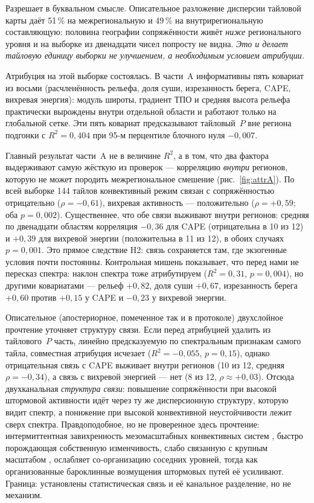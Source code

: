 \documentclass[11pt,a4paper]{article}
\begin{document}
Разрешает в буквальном смысле. Описательное разложение дисперсии тайловой карты даёт 51\,\% на межрегиональную и 49\,\% на внутрирегиональную составляющую: половина географии сопряжённости живёт \emph{ниже} регионального уровня и на выборке из двенадцати чисел попросту не видна. \emph{Это и делает тайловую единицу выборки не улучшением, а необходимым условием атрибуции.}

Атрибуция на этой выборке состоялась. В части~A информативны пять ковариат из восьми (расчленённость рельефа, доля суши, изрезанность берега, CAPE, вихревая энергия): модуль широты, градиент ТПО и средняя высота рельефа практически вырождены внутри отдельной области и работают только на глобальной сетке. Эти пять ковариат предсказывают тайловый~$P$ вне региона подгонки с $R^2=0{,}404$ при 95-м перцентиле блочного нуля $-0{,}007$.

Главный результат части~A не в величине $R^2$, а в том, что два фактора выдерживают самую жёсткую из проверок --- корреляцию \emph{внутри} регионов, которую не может породить межрегиональное смешение (рис.~\ref{fig:attrA}). По всей выборке 144 тайлов конвективный режим связан с сопряжённостью отрицательно ($\rho=-0{,}61$), вихревая активность --- положительно ($\rho=+0{,}59$; оба $p=0{,}002$). Существеннее, что обе связи выживают внутри регионов: средняя по двенадцати областям корреляция $-0{,}36$ для CAPE (отрицательна в 10 из 12) и $+0{,}39$ для вихревой энергии (положительна в 11 из 12), в обоих случаях $p=0{,}001$. Это прямое следствие H2: связь сохраняется там, где экзогенные условия почти постоянны. Контрольная мишень показывает, что перед нами не пересказ спектра: наклон спектра тоже атрибутируем ($R^2=0{,}31$, $p=0{,}004$), но другими ковариатами --- рельеф $+0{,}82$, доля суши $+0{,}67$, изрезанность берега $+0{,}60$ против $+0{,}15$ у CAPE и $-0{,}23$ у вихревой энергии.

Описательное (апостериорное, помеченное так и в протоколе) двухслойное прочтение уточняет структуру связи. Если перед атрибуцией удалить из тайлового~$P$ часть, линейно предсказуемую по спектральным признакам самого тайла, совместная атрибуция исчезает ($R^2=-0{,}055$, $p=0{,}15$), однако отрицательная связь с CAPE выживает внутри регионов (10 из 12, средняя $\rho=-0{,}34$), а связь с вихревой энергией --- нет (8 из 12, $\rho\approx+0{,}03$). Отсюда двухканальная \emph{структура связи}: повышение сопряжённости при высокой штормовой активности идёт через ту же дисперсионную структуру, которую видит спектр, а понижение при высокой конвективной неустойчивости лежит сверх спектра. Правдоподобное, но не проверенное здесь прочтение: интермиттентная завихренность мезомасштабных конвективных систем \cite{Houze2004,Feng2021,PetersNeelin2006}, быстро порождающая собственную изменчивость, слабо связанную с крупным масштабом \cite{Zhang2007,RotunnoSnyder2008,Judt2020}, ослабляет со-организацию соседних уровней, тогда как организованные бароклинные возмущения штормовых путей её усиливают. Граница: установлены статистическая связь и её канальное разделение, но не механизм.
\end{document}
